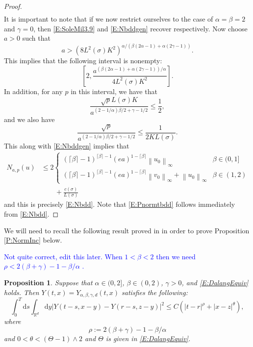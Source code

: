 \documentclass[a4paper,11pt]{article}
\numberwithin{equation}{section}
\theoremstyle{plain}
\newtheorem{proposition}[theorem]{Proposition}
\theoremstyle{definition}
\newcommand{\ud}{\ensuremath{\mathrm{d} }}
\newcommand{\Norm}[1]{\left\|  #1   \right\|}
\newcommand{\R}{\mathbb{R}}
\numberwithin{NQ}{section}
\numberwithin{LQ}{section}
\numberwithin{ZQ}{section}
\begin{document}
\begin{proof}
\begin{align}
	\end{align}
It is important to note that if we now restrict ourselves to the case of $\alpha = \beta = 2$ and $\gamma =0$, then \eqref{E:SoleMil3.9} and \eqref{E:Nbddgen} recover \cite[(3.9) and (3.10)]{SoleMillet2021} respectively. Now choose $a>0$ such that 
	\[
		a > \left( 8 L^2(\sigma)K^2\right)^{\alpha/(\beta(2\alpha-1)+\alpha(2\gamma -1))}.
	\]
This implies that the following interval is nonempty:
	\[
		\left[ 2, \frac{a^{(\beta(2\alpha-1)+\alpha(2\gamma-1))/\alpha}}{4L^2(\sigma)K^2} \right].
	\]
In addition, for any $p$ in this interval, we have that 
	\[
		\frac{\sqrt{p}L(\sigma)K}{a^{(2-1/\alpha)\beta/2+\gamma-1/2}} \le \frac{1}{2},
	\]
and we also have 
	\[
		\frac{\sqrt{p}}{a^{(2-1/\alpha)\beta/2+\gamma-1/2}}  \le \frac{1}{2KL(\sigma)}.
	\]
This along with \eqref{E:Nbddgen} implies that 
	\begin{align*}
		N_{a,p}(u) & \le 2 \begin{cases} 
		(\lceil \beta \rceil - 1)^{\lceil \beta \rceil -1}(ea)^{1-\lceil \beta \rceil} \Norm{u_0}_\infty  & \beta \in (0,1]
		\\ (\lceil \beta \rceil - 1)^{\lceil \beta \rceil -1}(ea)^{1-\lceil \beta \rceil} \Norm{v_0}_\infty + \Norm{u_0}_\infty & \beta \in (1,2)
		\end{cases} 
			\\& \quad \quad + \frac{c(\sigma)}{L(\sigma)}
	\end{align*}
and this is precisely \eqref{E:Nbdd}. Note that \eqref{E:Pnormtbdd} follows immediately from \eqref{E:Nbdd}.  
	\end{proof}

We will need to recall the following result proved in \cite{CHN19} in order to prove Proposition \ref{P:NormInc} below. 

\textcolor{blue}{Not quite correct, edit this later. When $1<\beta<2$ then we need $\rho < 2(\beta + \gamma) -1 - \beta/\alpha$ \cite[Proposition 2.2]{ChenHu21}.}

	\begin{proposition}{\normalfont\cite[Proposition 5.4]{CHN19}}
Suppose that $\alpha \in (0,2]$, $\beta \in (0,2)$, $\gamma>0$, and \eqref{E:DalangEquiv} holds. Then $Y(t,x) = Y_{\alpha, \beta, \gamma, d}(t,x)$ satisfies the following:
	\[
		\int_0^T \ud s \int_{\R^d} \ud y |Y(t-s,x-y) - Y(r-s,z-y)|^2 \le C \left(|t-r|^\rho + |x-z|^{\theta}\right),
	\]
where 
	\begin{equation}
	\label{D:rho}
		\rho := 2(\beta + \gamma) -1 - \beta/\alpha 
	\end{equation}
 and $0< \theta < (\Theta -1) \wedge 2$ and $\Theta$ is given in \eqref{E:DalangEquiv}.
	\end{proposition}
\end{document}
